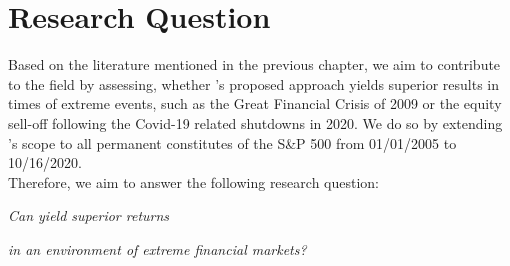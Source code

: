\section{Research Question}
Based on the literature mentioned in the previous chapter, we aim to contribute to the field by assessing, whether \citeauthor{anderson_cheng_2016}'s proposed approach yields superior results in times of extreme events, such as the Great Financial Crisis of 2009 or the equity sell-off following the Covid-19 related shutdowns in 2020. We do so by extending \citeauthor{anderson_cheng_2016}'s scope to all permanent constitutes of the S&P 500 from 01/01/2005 to 10/16/2020.\\
Therefore, we aim to answer the following research question:\\

\centerline{\emph{Can  yield superior returns}}
\centerline{\emph{in an environment of extreme financial markets?}}
 
